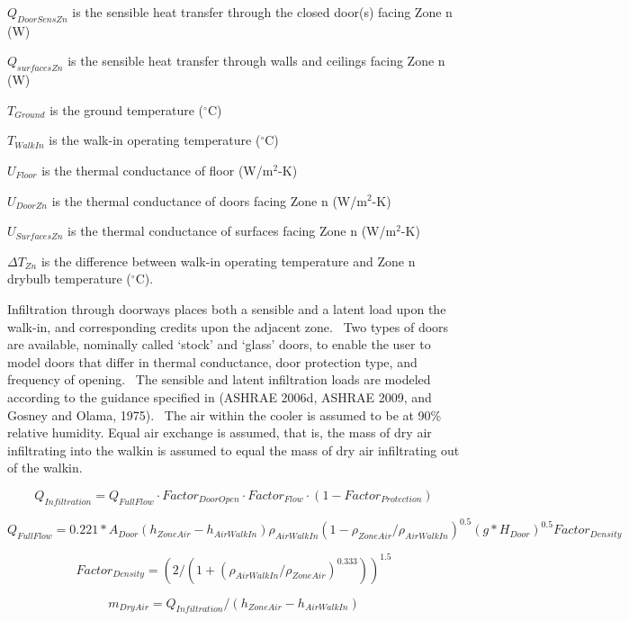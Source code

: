 \(Q_{DoorSensZn}\) is the sensible heat transfer through the closed door(s) facing Zone n (W)

\(Q_{surfacesZn}\) is the sensible heat transfer through walls and ceilings facing Zone n (W)

\(T_{Ground}\) is the ground temperature (\(^{\circ}\)C)

\(T_{WalkIn}\) is the walk-in operating temperature (\(^{\circ}\)C)

\(U_{Floor}\) is the thermal conductance of floor (W/m\(^{2}\)-K)

\(U_{DoorZn}\) is the thermal conductance of doors facing Zone n (W/m\(^{2}\)-K)

\(U_{SurfacesZn}\) is the thermal conductance of surfaces facing Zone n (W/m\(^{2}\)-K)

\(\Delta T_{Zn}\) is the difference between walk-in operating temperature and Zone n drybulb temperature (\(^{\circ}\)C).

Infiltration through doorways places both a sensible and a latent load upon the walk-in, and corresponding credits upon the adjacent zone.~ Two types of doors are available, nominally called `stock' and `glass' doors, to enable the user to model doors that differ in thermal conductance, door protection type, and frequency of opening.~ The sensible and latent infiltration loads are modeled according to the guidance specified in (ASHRAE 2006d, ASHRAE 2009, and Gosney and Olama, 1975).~ The air within the cooler is assumed to be at 90\% relative humidity. Equal air exchange is assumed, that is, the mass of dry air infiltrating into the walkin is assumed to equal the mass of dry air infiltrating out of the walkin.

\begin{equation}
Q_{Infiltration} = Q_{FullFlow} \cdot Factor_{DoorOpen} \cdot Factor_{Flow} \cdot (1 - Factor_{Protection})
\end{equation}

\begin{equation}
Q_{FullFlow} = 0.221*A_{Door}(h_{ZoneAir}-h_{AirWalkIn})\rho_{AirWalkIn}(1-\rho_{ZoneAir}/\rho_{AirWalkIn})^{0.5}(g*H_{Door})^{0.5}Factor_{Density}
\end{equation}

\begin{equation}
Factor_{Density} = (2 /(1 + (\rho_{AirWalkIn} / \rho_{ZoneAir})^{0.333}))^{1.5}
\end{equation}

\begin{equation}
m_{DryAir} = Q_{Infiltration} / (h_{ZoneAir} - h_{AirWalkIn})
\end{equation}

